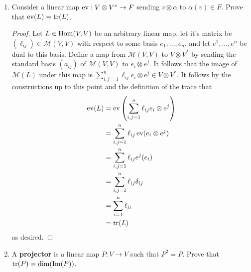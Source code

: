 \documentclass[../psets.tex]{subfiles}
\begin{document}
\begin{enumerate}
\begin{enumerate}
\begin{proof}
            Let $e_1,\dots,e_n$ be an arbitrary basis of $V$, and let $e^1,\dots,e^n$ be its dual basis. Under the isomorphism constructed in class, the element
            \begin{equation*}
                e_1\otimes e^1+\cdots+e_n\otimes e^n \mapsto [v\mapsto e^1(v)e_1]+\cdots+[v\mapsto e^n(v)e_n]
            \end{equation*}
            where $[v\mapsto e^i(v)e_i]$ denotes the linear map in $\Hom(V,V)$ sending $v$ to its $i^\text{th}$ component. Importantly, under the usual rules of adding functions, we can see that linear map on the right above is equal to
            \begin{equation*}
                [v\mapsto e^1(v)e_1+\cdots+e^n(v)e_n] = [v\mapsto v_1e_1+\cdots+v_ne_n] = [v\mapsto v] = 1
            \end{equation*}
            where $1\in\Hom(V,V)$ is the identity map.
        \end{proof}
        \item Consider a linear map $\operatorname{ev}:V\otimes V^*\to F$ sending $v\otimes\alpha$ to $\alpha(v)\in F$. Prove that $\operatorname{ev}(L)=\tr(L)$.
        \begin{proof}
            Let $L\in\operatorname{Hom}(V,V)$ be an arbitrary linear map, let it's matrix be $(\ell_{ij})\in\mathcal{M}(V,V)$ with respect to some basis $e_1,\dots,e_n$, and let $e^1,\dots,e^n$ be dual to this basis. Define a map from $\mathcal{M}(V,V)$ to $V\otimes V^*$ by sending the standard basis $(a_{ij})$ of $\mathcal{M}(V,V)$ to $e_i\otimes e^j$. It follows that the image of $\mathcal{M}(L)$ under this map is $\sum_{i,j=1}^n\ell_{ij}e_i\otimes e^j\in V\otimes V^*$. It follows by the constructions up to this point and the definition of the trace that
            \begin{align*}
                \operatorname{ev}(L) &= \operatorname{ev}\left( \sum_{i,j=1}^n\ell_{ij}e_i\otimes e^j \right)\\
                &= \sum_{i,j=1}^n\ell_{ij}\operatorname{ev}(e_i\otimes e^j)\\
                &= \sum_{i,j=1}^n\ell_{ij}e^j(e_i)\\
                &= \sum_{i,j=1}^n\ell_{ij}\delta_{ij}\\
                &= \sum_{i=1}^n\ell_{ii}\\
                &= \tr(L)
            \end{align*}
            as desired.
        \end{proof}
        \item A \textbf{projector} is a linear map $P:V\to V$ such that $P^2=P$. Prove that $\tr(P)=\dim(\operatorname{Im}(P))$.

\end{enumerate}
\end{enumerate}
\end{document}
